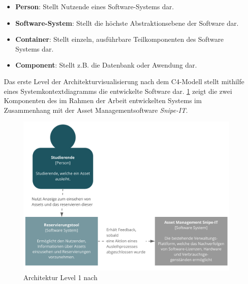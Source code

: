\begin{itemize}
    \item \textbf{Person}: Stellt Nutzende eines Software-Systems dar.
    \item \textbf{Software-System}: Stellt die höchste Abstraktionsebene der Software dar.
    \item \textbf{Container}: Stellt einzeln, ausführbare Teilkomponenten des Software Systems dar. 
    \item \textbf{Component}: Stellt z.B. die Datenbank oder Awendung dar.
\end{itemize}

{\sffamily\color{maincolor}{Level 1: Context}} 

Das erste Level der Architekturvisualisierung nach dem C4-Modell stellt mithilfe eines
Systemkontextdiagramms die entwickelte Software dar. \ref{fig:level1} zeigt die zwei Komponenten
des im Rahmen der Arbeit entwickelten Systems im Zusammenhang mit der Asset Managementsoftware
\textit{Snipe-IT}.

\begin{figure}[h]
    \centering
    \includegraphics[scale=0.4]{Bilder/level1.pdf}
    \caption[Architektur Level 1]{Architektur Level 1 nach }
    \label{fig:level1}
\end{figure}

